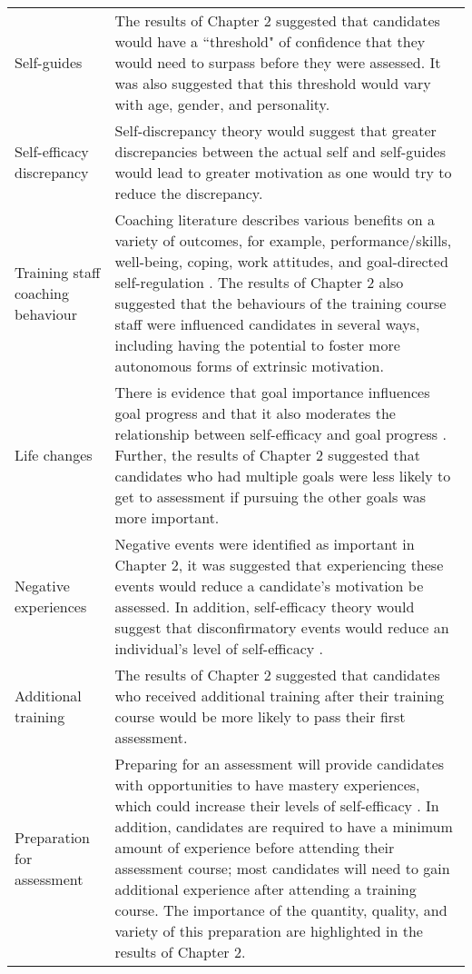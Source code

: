 \documentclass[
  12pt,
  a4paper,
]{book}
\begin{document}
\begin{landscape}
\begin{longtable}[t]{>{\raggedright\arraybackslash}p{3cm}>{\raggedright\arraybackslash}p{21cm}}
\rowcolor{gray!6}  Self-guides & The results of Chapter 2 suggested that candidates would have a ``threshold" of confidence that they would need to surpass before they were assessed. It was also suggested that this threshold would vary with age, gender, and personality.\\
Self-efficacy discrepancy & Self-discrepancy theory \citep[cf.][]{Higgins1987} would suggest that greater discrepancies between the actual self and self-guides would lead to greater motivation as one would try to reduce the discrepancy.\\
\rowcolor{gray!6}  Training staff coaching behaviour & Coaching literature describes various benefits on a variety of outcomes, for example, performance/skills, well-being, coping, work attitudes, and goal-directed self-regulation \citep[e.g.,][]{Theeboom2014a, Weinberg2014}. The results of Chapter 2 also suggested that the behaviours of the training course staff were influenced candidates in several ways, including having the potential to foster more autonomous forms of extrinsic motivation.\\
\addlinespace
Life changes & There is evidence that goal importance influences goal progress and that it also moderates the relationship between self-efficacy and goal progress \citep[cf.][]{Beattie2015}. Further, the results of Chapter 2 suggested that candidates who had multiple goals were less likely to get to assessment if pursuing the other goals was more important.\\
\rowcolor{gray!6}  Negative experiences & Negative events were identified as important in Chapter 2, it was suggested that experiencing these events would reduce a candidate's motivation be assessed. In addition, self-efficacy theory would suggest that disconfirmatory events would reduce an individual's level of self-efficacy \citep{Bandura1977, Bandura1982}.\\
Additional training & The results of Chapter 2 suggested that candidates who received additional training after their training course would be more likely to pass their first assessment.\\
\rowcolor{gray!6}  Preparation for assessment & Preparing for an assessment will provide candidates with opportunities to have mastery experiences, which could increase their levels of self-efficacy \citep{Bandura1977, Bandura1982}. In addition, candidates are required to have a minimum amount of experience before attending their assessment course; most candidates will need to gain additional experience after attending a training course. The importance of the quantity, quality, and variety of this preparation are highlighted in the results of Chapter 2.\\

\end{longtable}
\end{landscape}
\end{document}
